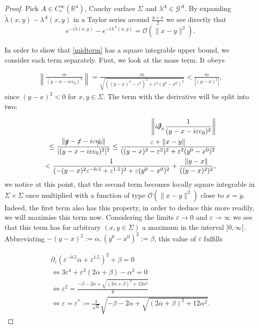\documentclass[b5paper,draft,openbib,12pt]{memoir}
\begin{document}
\begin{proof}
Pick \(A\in C_c^\infty(\mathbb{R}^4)\), Cauchy surface \(\Sigma\) and \(\lambda^A\in \mathcal{G}^A\).
By expanding \(\tilde{\lambda}(x,y)-\lambda^A(x,y)\) in a Taylor series around \(\frac{y+x}{2}\) we see directly that
\begin{equation}
e^{-i\tilde{\lambda}(x,y)}-e^{-i\lambda^A(x,y)}=\mathcal{O}(\|x-y\|^2).
\end{equation}

In order to show that \eqref{midterm} has a square integrable upper bound, we consider each term separately.  First, we look at the mass term. 
It obeys

\begin{align}
\left\|\frac{m}{(y-x-i\varepsilon e_0)^2}\right\|= \frac{m}{\sqrt{((y-x)^2-\varepsilon^2)^2+\varepsilon^2(y^0-x^0)^2}}<\frac{m}{|(y-x)^2|},
\end{align}
since \((y-x)^2<0\) for \(x,y\in \Sigma\). The term with the derivative will be split into two:

\begin{align}
\left\| i\slashed{\partial}_x \frac{1}{(y-x-i\varepsilon e_0)^2} \right\|\\
\le \frac{\| \slashed{y}-\slashed{x}-i\varepsilon \slashed{e_0}\|}{| (y-x-i\varepsilon e_0)^2|^2}
\le \frac{\varepsilon + \|x-y\|}{((y-x)^2-\varepsilon^2)^2+\varepsilon^2 (y^0-x^0)^2}\\\label{eq:uglyterm}
<\frac{1}{(-(y-x)^2 \varepsilon^{-0.5}+\varepsilon^{1.5})^2+\varepsilon(y^0-x^0)^2} +\frac{\|y-x\|}{((y-x)^2)^2},
\end{align}
we notice at this point, that the second term becomes locally square integrable in \(\Sigma\times\Sigma\) 
once multiplied with a function of type \(\mathcal{O}(\|x-y\|^2)\) close to \(x=y\). Indeed, the first term also has this property, in order to
deduce this more readily, we will maximise this term now.  Considering the limits \(\varepsilon \rightarrow 0\) and \(\varepsilon \rightarrow \infty\)
we see that this term has for arbitrary \((x,y\in\Sigma)\) a maximum in the interval \(]0,\infty[\). 
Abbreviating \(-(y-x)^2:=\alpha, (y^0-x^0)^2:=\beta\), this value of \(\varepsilon\) fulfills

\begin{align}
\partial_\varepsilon ( \varepsilon^{-0.5}\alpha + \varepsilon^{1.5})^2+\beta=0\\
\iff 3 \varepsilon^4 + \varepsilon^2(2 \alpha+\beta)-\alpha^2=0\\
\iff \varepsilon^2= \frac{-\beta-2\alpha + \sqrt{(2\alpha + \beta)^2+12 \alpha^2}}{6}\\
\iff \varepsilon=\varepsilon^* :=\frac{1}{\sqrt{6}} \sqrt{-\beta-2\alpha + \sqrt{(2\alpha + \beta)^2+12 \alpha^2}}.
\end{align}


\end{proof}
\end{document}
